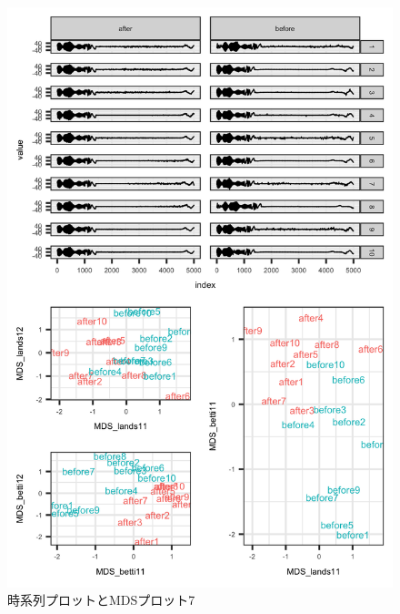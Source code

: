 \documentclass{jarticle}
\begin{document}
\begin{figure}[H]
	\begin{center}
		\includegraphics[width=15cm]{fig/MDS_plot7.png}
		\caption{時系列プロットとMDSプロット7}
		\label{fig:MDS_plot7}
	\end{center}
\end{figure}
\end{document}
